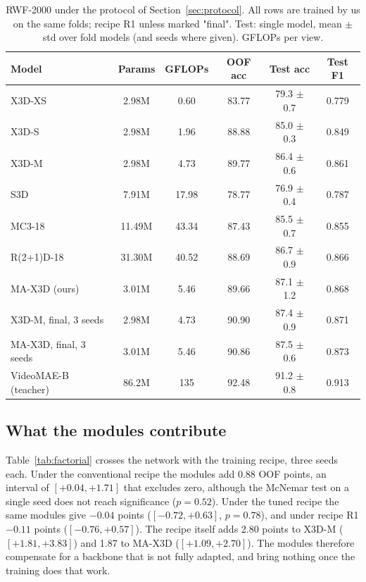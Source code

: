 \documentclass[conference]{IEEEtran}
\begin{document}
\begin{table}[t]
  \centering
  \caption{RWF-2000 under the protocol of Section~\ref{sec:protocol}. All
  rows are trained by us on the same folds; recipe R1 unless marked
  "final". Test: single model, mean $\pm$ std over fold models (and seeds
  where given). GFLOPs per view.}
  \label{tab:sota}
  \setlength{\tabcolsep}{2.5pt}
  \begin{tabular}{lccccc}
    \toprule
    Model & Params & GFLOPs & OOF acc & Test acc & Test F1 \\
    \midrule
    X3D-XS~\cite{x3d}        & 2.98M  & 0.60  & 83.77 & 79.3 $\pm$ 0.7 & 0.779 \\
    X3D-S~\cite{x3d}         & 2.98M  & 1.96  & 88.88 & 85.0 $\pm$ 0.3 & 0.849 \\
    X3D-M~\cite{x3d}         & 2.98M  & 4.73  & 89.77 & 86.4 $\pm$ 0.6 & 0.861 \\
    S3D~\cite{s3d}           & 7.91M  & 17.98 & 78.77 & 76.9 $\pm$ 0.4 & 0.787 \\
    MC3-18~\cite{r2plus1d}   & 11.49M & 43.34 & 87.43 & 85.5 $\pm$ 0.7 & 0.855 \\
    R(2+1)D-18~\cite{r2plus1d} & 31.30M & 40.52 & 88.69 & 86.7 $\pm$ 0.9 & 0.866 \\
    MA-X3D (ours)            & 3.01M  & 5.46  & 89.66 & 87.1 $\pm$ 1.2 & 0.868 \\
    \midrule
    X3D-M, final, 3 seeds    & 2.98M  & 4.73  & 90.90 & 87.4 $\pm$ 0.9 & 0.871 \\
    MA-X3D, final, 3 seeds   & 3.01M  & 5.46  & 90.86 & 87.5 $\pm$ 0.6 & 0.873 \\
    \midrule
    VideoMAE-B~\cite{videomae} (teacher) & 86.2M & 135 & 92.48 & 91.2 $\pm$ 0.8 & 0.913 \\
    \bottomrule
  \end{tabular}
\end{table}

\subsection{What the modules contribute}
\label{sec:modules}

Table~\ref{tab:factorial} crosses the network with the training recipe,
three seeds each. Under the conventional recipe the modules add 0.88 OOF
points, an interval of $[+0.04, +1.71]$ that excludes zero, although the
McNemar test on a single seed does not reach significance ($p = 0.52$).
Under the tuned recipe the same modules give $-0.04$ points
($[-0.72, +0.63]$, $p = 0.78$), and under recipe R1 $-0.11$ points
($[-0.76, +0.57]$). The recipe itself adds 2.80 points to X3D-M
($[+1.81, +3.83]$) and 1.87 to MA-X3D ($[+1.09, +2.70]$). The modules
therefore compensate for a backbone that is not fully adapted, and bring
nothing once the training does that work.
\end{document}
